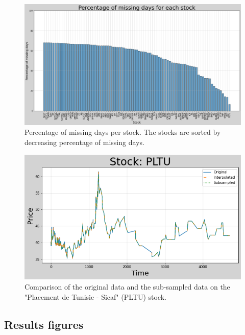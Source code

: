 \documentclass[11pt]{article}
\begin{document}
\begin{figure}[H]
    \centering
    \begin{minipage}[t]{0.75\textwidth}
    \includegraphics[width=\textwidth]{figures/preprocessing/bar_missing_days.png}
    \caption{Percentage of missing days per stock. The stocks are sorted by decreasing percentage of missing days.}
    \label{fig:bar_missing_days}
    \end{minipage}
\end{figure}

\begin{figure}[H]
    \centering
    \begin{minipage}[t]{0.7\textwidth}
    \includegraphics[width=\textwidth]{figures/preprocessing/subsample.png}
    \caption{Comparison of the original data and the sub-sampled data on the "Placement de Tunisie - Sicaf" (PLTU) stock.}
    \label{fig:subsample}
    \end{minipage}
\end{figure}

\subsection{Results figures}
\end{document}
